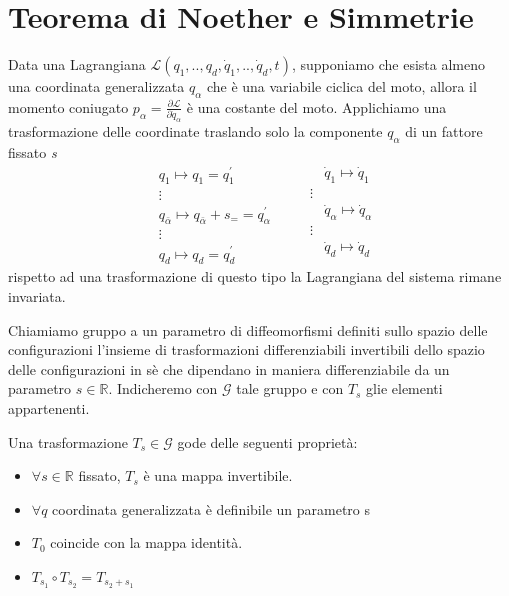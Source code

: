 \section{Teorema di Noether e Simmetrie}

Data una Lagrangiana $\mathcal{L}(q_1,..,q_d,\dot{q}_1,..,\dot{q}_d,t)$, supponiamo che esista almeno una coordinata generalizzata $q_{\alpha}$ che \`{e} una variabile ciclica del moto, allora il momento coniugato $p_{\alpha} = \frac{\partial \mathcal{L}}{\partial \dot{q}_{\alpha}}$ \`{e} una costante del moto. Applichiamo una trasformazione delle coordinate traslando solo la componente $q_{\alpha}$ di un fattore fissato \textit{s}
\begin{equation}
\begin{aligned}
& q_1 \longmapsto q_1=q_1^{\prime} \\
& \vdots \\
& q_{\bar{\alpha}} \longmapsto q_{\bar{\alpha}}+s_{=}=q_{\alpha}^{\prime} \\
& \vdots \\
& q_d \longmapsto q_d=q_d^{\prime}
\end{aligned}
\quad \quad
\begin{aligned}
& \dot{q}_1 \longmapsto \dot{q}_1 \\
\vdots \\
& \dot{q}_{\alpha} \longmapsto \dot{q}_{\alpha} \\
\vdots \\
& \dot{q}_d \longmapsto \dot{q}_d \\
\end{aligned}
\end{equation}
rispetto ad una trasformazione di questo tipo la Lagrangiana del sistema rimane invariata. 

\begin{definition}
	Chiamiamo gruppo a un parametro di diffeomorfismi definiti sullo spazio delle configurazioni
l'insieme di trasformazioni differenziabili invertibili dello spazio delle configurazioni in s\`{e} che dipendano in maniera differenziabile da un parametro $s \in \mathbb{R}$. Indicheremo con $\mathcal{G}$ tale gruppo e con $T_s$ glie elementi appartenenti.
\end{definition}

\begin{definition}
	Una trasformazione $T_s \in \mathcal{G}$ gode delle seguenti propriet\`{a}:
	\begin{itemize}
		\item $\forall s \in \mathbb{R}$ fissato, $T_s$ \`{e} una mappa invertibile.
		\item $\forall q $ coordinata generalizzata \`{e} definibile un parametro s
		\item $T_0 $ coincide con la mappa identit\`{a}.
		\item $T_{s_1} \circ T_{s_2} = T_{s_2 + s_1}$ 
	\end{itemize}
\end{definition}


